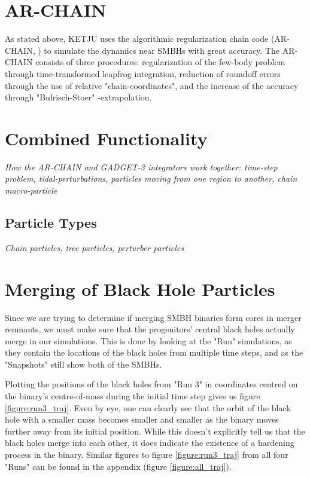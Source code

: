 \documentclass[english, oneside]{HYgradu}
\begin{document}
\section{AR-CHAIN} \label{section:ar-chain}

As stated above, KETJU uses the algorithmic regularization chain code (AR-CHAIN, \citealt{Mikkola2008ARCHAIN}) to simulate the dynamics near SMBHs with great accuracy. The AR-CHAIN consists of three procedures: regularization of the few-body problem through time-transformed leapfrog integration, reduction of roundoff errors through the use of relative "chain-coordinates", and the increase of the accuracy through "Bulrisch-Stoer" -extrapolation.

\section{Combined Functionality}

\textit{How the AR-CHAIN and GADGET-3 integrators work together: time-step problem, tidal-perturbations, particles moving from one region to another, chain macro-particle}

\subsection{Particle Types}

\textit{Chain particles, tree particles, perturber particles}

\section{Merging of Black Hole Particles}

Since we are trying to determine if merging SMBH binaries form cores in merger remnants, we must make sure that the progenitors' central black holes actually merge in our simulations. This is done by looking at the "Run" simulations, as they contain the locations of the black holes from multiple time steps, and as the "Snapshots" still show both of the SMBHs.

Plotting the positions of the black holes from "Run 3" in coordinates centred on the binary's centre-of-mass during the initial time step gives us figure \ref{figure:run3_traj}. Even by eye, one can clearly see that the orbit of the black hole with a smaller mass becomes smaller and smaller as the binary moves further away from its initial position. While this doesn't explicitly tell us that the black holes merge into each other, it does indicate the existence of a hardening process in the binary. Similar figures to figure \ref{figure:run3_traj} from all four "Runs" can be found in the appendix (figure \ref{figure:all_traj}).
\end{document}
